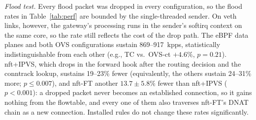 \documentclass[conference]{IEEEtran}
\begin{document}
\begin{table}[t]
\caption{In-kernel cost per processing path with one installed rule (ns;
mean of three runs $\pm$ half the range of the run means)}
\label{tab:paths}
\centering\scriptsize
\setlength{\tabcolsep}{1.6pt}
\end{table}

\textit{Flood test.} Every flood packet was dropped in every configuration,
so the flood rates in Table~\ref{tab:perf} are bounded by the single-threaded
sender. On veth links, however, the gateway's processing runs in the
sender's softirq context on the same core, so the rate still reflects the
cost of the drop path. The eBPF data planes and both OVS configurations
sustain 869--917~kpps, statistically indistinguishable from each other
(e.g., TC vs.\ OVS-ct $+4.6\%$, $p=0.21$). nft+IPVS, which drops in the
forward hook after the routing decision and the conntrack lookup, sustains
19--23\% fewer (equivalently, the others sustain 24--31\% more;
$p \le 0.007$), and nft-FT another $13.7 \pm 5.8\%$ fewer
than nft+IPVS ($p<0.001$): a dropped packet never becomes an established
connection, so it gains nothing from the flowtable, and every one of them
also traverses nft-FT's DNAT chain as a new connection. Installed rules do
not change these rates significantly.
\end{document}
